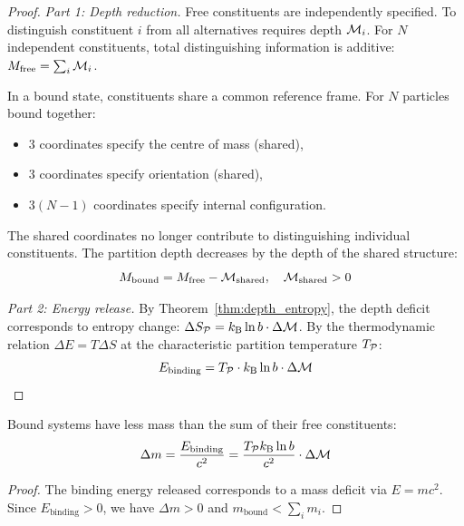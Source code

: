 \begin{proof}
\emph{Part 1: Depth reduction.} Free constituents are independently specified. To distinguish constituent $i$ from all alternatives requires depth $\mathcal{M}_i$. For $N$ independent constituents, total distinguishing information is additive: $M_{\mathrm{free}} = \sum_i \mathcal{M}_i$.

In a bound state, constituents share a common reference frame. For $N$ particles bound together:
\begin{itemize}
    \item 3 coordinates specify the centre of mass (shared),
    \item 3 coordinates specify orientation (shared),
    \item $3(N-1)$ coordinates specify internal configuration.
\end{itemize}
The shared coordinates no longer contribute to distinguishing individual constituents. The partition depth decreases by the depth of the shared structure:
\begin{equation}
    M_{\mathrm{bound}} = M_{\mathrm{free}} - \mathcal{M}_{\mathrm{shared}}, \quad \mathcal{M}_{\mathrm{shared}} > 0
\end{equation}

\emph{Part 2: Energy release.} By Theorem~\ref{thm:depth_entropy}, the depth deficit corresponds to entropy change: $\Delta S_{\mathcal{P}} = k_{\mathrm{B}} \ln b \cdot \Delta\mathcal{M}$. By the thermodynamic relation $\Delta E = T\Delta S$ at the characteristic partition temperature $T_{\mathcal{P}}$:
\begin{equation}
    E_{\mathrm{binding}} = T_{\mathcal{P}} \cdot k_{\mathrm{B}} \ln b \cdot \Delta\mathcal{M}
\end{equation}
\end{proof}

\begin{corollary}
\label{cor:mass_defect}
Bound systems have less mass than the sum of their free constituents:
\begin{equation}
    \Delta m = \frac{E_{\mathrm{binding}}}{c^2} = \frac{T_{\mathcal{P}} k_{\mathrm{B}} \ln b}{c^2} \cdot \Delta\mathcal{M}
\end{equation}
\end{corollary}

\begin{proof}
The binding energy released corresponds to a mass deficit via $E = mc^2$. Since $E_{\mathrm{binding}} > 0$, we have $\Delta m > 0$ and $m_{\mathrm{bound}} < \sum_i m_i$.
\end{proof}

